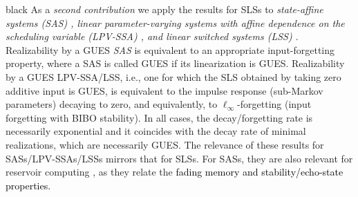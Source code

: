 \documentclass[journal,twoside,web]{ieeecolor}
\begin{document}
\begin{color}{black}
  As a \emph{second contribution} we apply 
  the results for SLSs 
  to \emph{state-affine systems (SAS) \cite{Son:Real}, linear parameter-varying systems with affine dependence on the scheduling variable (LPV-SSA) \cite{Petreczky2016,Toth1}, and linear switched systems (LSS) \cite{Sun:Book}}.
  Realizability by a GUES \emph{SAS }is equivalent to an appropriate input-forgetting property, where a SAS is called GUES if its linearization is GUES. 
  Realizability by a GUES LPV-SSA/LSS, i.e., one for which the SLS obtained by taking zero additive input is GUES, is equivalent to the impulse response (sub-Markov parameters) decaying to zero, and equivalently, to $\ell_\infty$-forgetting (input forgetting with BIBO stability).
%
   In all cases, the decay/forgetting rate is necessarily exponential and it coincides with the decay rate of minimal realizations, which are necessarily GUES. 
  The relevance of these results for SASs/LPV-SSAs/LSSs mirrors that for SLSs. For SASs, they
  are also relevant for reservoir computing \cite{Ortega4,Ortega3,Sepulchre1,GONON202110}, as they relate
  the \textcolor{black}{fading memory and stability/echo-state properties.}
  \end{color}
\end{document}

